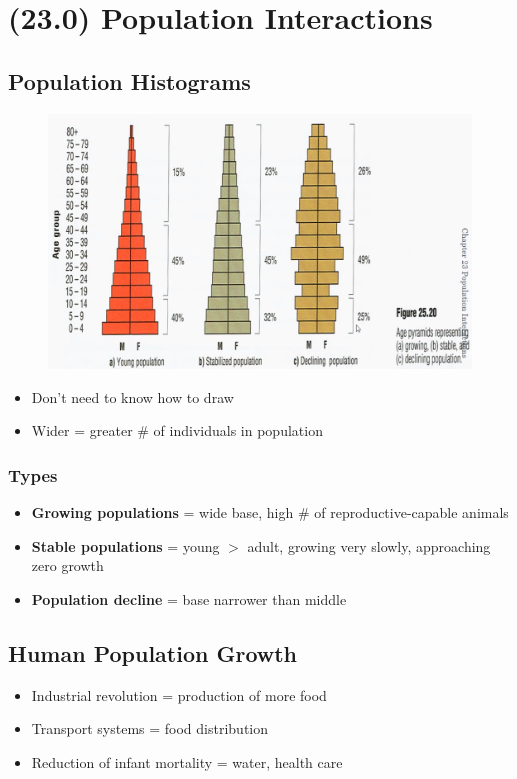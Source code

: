 \documentclass[a4paper,12pt]{article}
\begin{document}
\section{(23.0) Population Interactions}
\subsection{Population Histograms}
\begin{figure}[H]
    \centering
    \includegraphics[width=\textwidth]{hist}
\end{figure}
\begin{itemize}
    \item{Don't need to know how to draw}
    \item{Wider = greater \# of individuals in population}
\end{itemize}

\subsubsection{Types}
\begin{itemize}
    \item{\textbf{Growing populations} = wide base, high \# of reproductive-capable animals}
    \item{\textbf{Stable populations} = young $>$ adult, growing very slowly, approaching zero growth}
    \item{\textbf{Population decline} = base narrower than middle}
\end{itemize}

\subsection{Human Population Growth}
\begin{itemize}
    \item{Industrial revolution = production of more food}
    \item{Transport systems = food distribution}
    \item{Reduction of infant mortality = water, health care}
\end{itemize}
\end{document}
